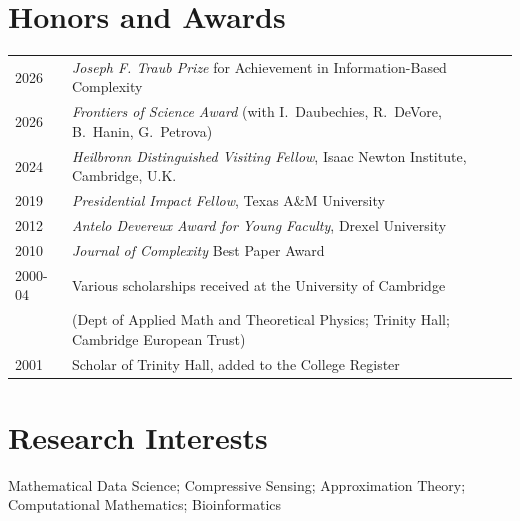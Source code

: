 \documentclass[11pt]{article}
\begin{document}
\section{Honors and Awards}

\begin{tabular}{ll}
2026 & {\sl Joseph F. Traub Prize} for Achievement in Information-Based Complexity\\
2026 & {\sl Frontiers of Science Award} (with 
I.~Daubechies, R.~DeVore, B.~Hanin, G.~Petrova)\\
2024 & %
{\sl Heilbronn Distinguished Visiting Fellow}, Isaac Newton Institute, Cambridge, U.K.\\
2019 & %
{\sl Presidential Impact Fellow}, Texas A\&M University\\
2012 & %
{\sl Antelo Devereux Award for Young Faculty}, Drexel University\\
2010 & {\sl Journal of Complexity} Best Paper Award\\
2000-04 & Various scholarships received at the University of Cambridge\\
& (Dept  of Applied Math and Theoretical Physics; Trinity Hall; Cambridge European Trust)\\
2001 & Scholar of Trinity Hall, %
added to the College Register
\end{tabular}

\section{Research Interests}

Mathematical Data Science;
Compressive Sensing;
Approximation Theory; 
Computational Mathematics;
Bioinformatics 


 
\end{document}
